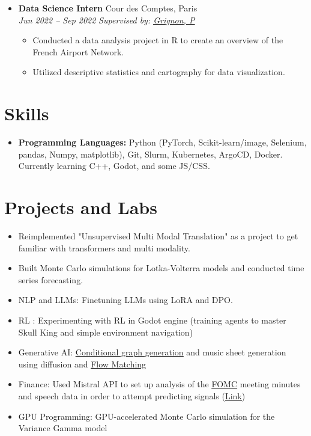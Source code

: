 \documentclass[letterpaper,11pt,twocolumn]{article}
\newcommand{\resumeItem}[1]{\item \small{#1}}
\newcommand{\resumeSubheading}[4]{
	\vspace{-2pt}\item \textbf{#1} \hfill #2 \\
	\textit{\small #3} \hfill \textit{\small #4} 
	\vspace{-7pt}
}
\newcommand{\resumeItemListStart}{\begin{itemize}[leftmargin=*]}
\newcommand{\resumeItemListEnd}{\end{itemize}\vspace{-5pt}}
\begin{document}
\begin{itemize}[leftmargin=*]
	\resumeSubheading
	{Data Science Intern}{Cour des Comptes, Paris}{Jun 2022 -- Sep 2022}{\textit{Supervised by: \href{https://fr.linkedin.com/in/paulgrignon}{\underline{Grignon, P}}}}
	
	\resumeItemListStart
	\resumeItem{Conducted a data analysis project in R to create an overview of the French Airport Network.}
	\resumeItem{Utilized descriptive statistics and cartography for data visualization.}
	\resumeItemListEnd
\end{itemize}

\section{Skills}
\begin{itemize}[leftmargin=*]
	\item \textbf{Programming Languages:} Python (PyTorch, Scikit-learn/image, Selenium, pandas, Numpy, matplotlib), Git, Slurm, Kubernetes, ArgoCD, Docker. Currently learning C++, Godot, and some JS/CSS.
\end{itemize}

\section{Projects and Labs}
\begin{itemize}[leftmargin=*]
	\resumeItem{Reimplemented "Unsupervised Multi Modal Translation" as a project to get familiar with transformers and multi modality.}
	\resumeItem{Built Monte Carlo simulations for Lotka-Volterra models and conducted time series forecasting.}
	\resumeItem{NLP and LLMs: Finetuning LLMs using LoRA and DPO.}
	\resumeItem{RL : Experimenting with RL in Godot engine (training agents to master Skull King and simple environment navigation)}
	\resumeItem{Generative AI: \underline{\href{https://github.com/MachtaYassine/GGSP-ALTEGRAD/tree/main}{Conditional graph generation}} and music sheet generation using diffusion and \underline{\href{https://colab.research.google.com/drive/1HT1E62hvaACGgLNt3xu5m51AO4m_fTxO}{Flow Matching}}}
	\resumeItem{Finance: Used Mistral API to set up analysis of the \href{https://www.federalreserve.gov/monetarypolicy/fomccalendars.htm}{\underline{FOMC}} meeting minutes and speech data in order to attempt predicting signals (\underline{\href{https://colab.research.google.com/drive/1qGfLkEFJ_ta2YnJD77EUxmsFi99Svo5X?usp=sharing}{Link}})}
	\resumeItem{GPU Programming: GPU-accelerated Monte Carlo simulation for the Variance Gamma model}
\end{itemize}
\end{document}
